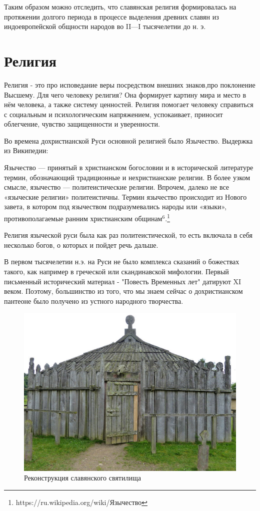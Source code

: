\documentclass[a4paper, 12pt]{report}
\begin{document}
Таким образом можно отследить, что славянская религия формировалась на протяжении долгого периода в процессе выделения древних славян из индоевропейской общности народов во II—I тысячелетии до н. э. 


\chapter{Религия}

Религия - это про исповедание веры посредством внешних знаков,про поклонение Высшему. Для чего человеку религия? Она формирует картину мира и место в нём человека, а также систему ценностей. Религия помогает человеку справиться с социальным и психологическим напряжением, успокаивает, приносит облегчение, чувство защищенности и уверенности. 

Во времена дохристианской Руси основной религией было Язычество. Выдержка из Википедии:

Язычество — принятый в христианском богословии и в исторической литературе термин, обозначающий традиционные и нехристианские религии. В более узком смысле, язычество — политеистические религии. Впрочем, далеко не все «языческие религии» политеистичны. Термин язычество происходит из Нового завета, в котором под язычеством подразумевались народы или «языки», противополагаемые ранним христианским общинам$^6$.\footnote{https://ru.wikipedia.org/wiki/Язычество}

Религия языческой руси была как раз политеистической, то есть включала в себя несколько богов, о которых и пойдет речь дальше.

В первом тысячелетии н.э. на Руси не было комплекса сказаний о божествах такого, как например в греческой или скандинавской мифологии. Первый письменный исторический материал - "Повесть Временных лет" датируют XI веком. Поэтому, большинство из того, что мы знаем сейчас о дохристианском пантеоне было получено из устного народного творчества.

\begin{figure}[h]
	\caption{Реконструкция славянского святилища}
	\begin{center}
	\includegraphics[scale = 0.5]{2.eps}
	\end{center}
\end{figure} 
\end{document}
